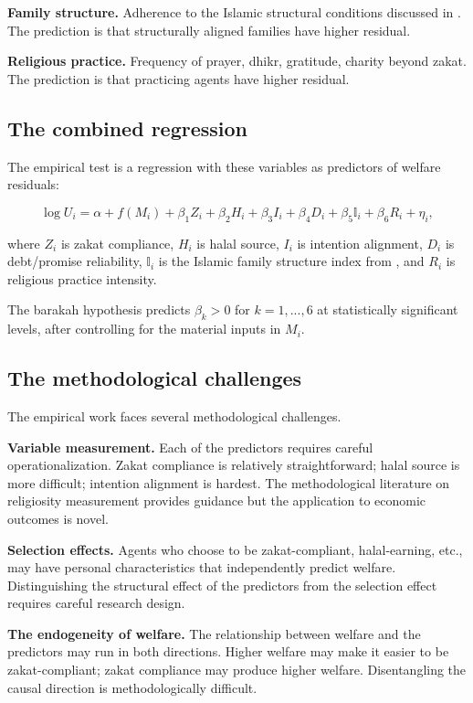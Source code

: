 \textbf{Family structure.} Adherence to the Islamic structural
conditions discussed in . The
prediction is that structurally aligned families have higher
residual.

\textbf{Religious practice.} Frequency of prayer, dhikr,
gratitude, charity beyond zakat. The prediction is that practicing
agents have higher residual.

\subsection{The combined regression}

The empirical test is a regression with these variables as
predictors of welfare residuals:

\[
    \log U_i = \alpha + f(M_i) + \beta_1 Z_i + \beta_2 H_i + \beta_3 I_i + \beta_4 D_i + \beta_5 \mathbb{I}_i + \beta_6 R_i + \eta_i,
\]

where $Z_i$ is zakat compliance, $H_i$ is halal source, $I_i$ is
intention alignment, $D_i$ is debt/promise reliability, $\mathbb{I}_i$
is the Islamic family structure index from ,
and $R_i$ is religious practice intensity.

The barakah hypothesis predicts $\beta_k > 0$ for $k = 1, ..., 6$
at statistically significant levels, after controlling for the
material inputs in $M_i$.

\subsection{The methodological challenges}

The empirical work faces several methodological challenges.

\textbf{Variable measurement.} Each of the predictors requires
careful operationalization. Zakat compliance is relatively
straightforward; halal source is more difficult; intention
alignment is hardest. The methodological literature on religiosity
measurement provides guidance but the application to economic
outcomes is novel.

\textbf{Selection effects.} Agents who choose to be zakat-compliant,
halal-earning, etc., may have personal characteristics that
independently predict welfare. Distinguishing the structural
effect of the predictors from the selection effect requires
careful research design.

\textbf{The endogeneity of welfare.} The relationship between
welfare and the predictors may run in both directions. Higher
welfare may make it easier to be zakat-compliant; zakat
compliance may produce higher welfare. Disentangling the causal
direction is methodologically difficult.

